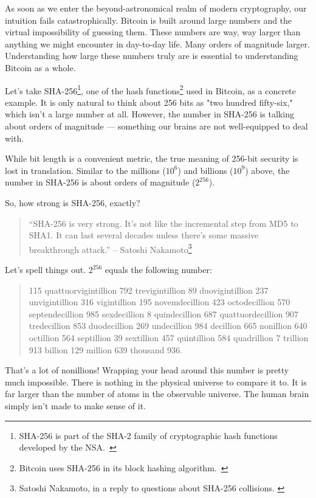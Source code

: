 As soon as we enter the beyond-astronomical realm of modern
cryptography, our intuition fails catastrophically. Bitcoin is built
around large numbers and the virtual impossibility of guessing them.
These numbers are way, way larger than anything we might encounter in
day-to-day life. Many orders of magnitude larger. Understanding how
large these numbers truly are is essential to understanding Bitcoin as a
whole.

Let's take SHA-256\footnote{SHA-256 is part of the SHA-2 family of cryptographic
hash functions developed by the NSA.~\cite{wiki:sha2}}, one of the hash
functions\footnote{Bitcoin uses SHA-256 in its block hashing
algorithm.~\cite{btcwiki:block-hashing}} used in Bitcoin, as a concrete example.
It is only natural to think about 256 bits as "two hundred fifty-six," which
isn't a large number at all. However, the number in SHA-256 is talking about
orders of magnitude --- something our brains are not well-equipped to deal with.

While bit length is a convenient metric, the true meaning of 256-bit
security is lost in translation. Similar to the millions ($10^6$) and
billions ($10^9$) above, the number in SHA-256 is about orders of magnitude
($2^{256}$).

So, how strong is SHA-256, exactly?

\begin{quotation}
``SHA-256 is very strong. It's not like the incremental step from MD5
to SHA1. It can last several decades unless there's some massive
breakthrough attack.''
\flushright -- Satoshi Nakamoto\footnote{Satoshi Nakamoto, in a reply to questions about SHA-256 collisions. \cite{satoshi-sha256}}
\end{quotation}

Let's spell things out. $2^{256}$ equals the following number:

\begin{quotation}
    115 quattuorvigintillion 792 trevigintillion 89 duovigintillion 237
    unvigintillion 316 vigintillion 195 novemdecillion 423 octodecillion 570
    septendecillion 985 sexdecillion 8 quindecillion 687 quattuordecillion 907
    tredecillion 853 duodecillion 269 undecillion 984 decillion 665 nonillion
    640 octillion 564 septillion 39 sextillion 457 quintillion 584 quadrillion 7
    trillion 913 billion 129 million 639 thousand 936.
\end{quotation}

That's a lot of nonillions! Wrapping your head around this number is
pretty much impossible. There is nothing in the physical universe to
compare it to. It is far larger than the number of atoms in the
observable universe. The human brain simply isn't made to make sense of
it.

